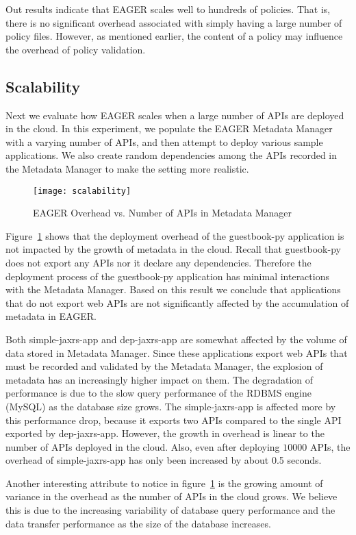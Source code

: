 Out results indicate that EAGER scales well to hundreds of policies. That is,
there is no significant overhead associated with simply having a large number
of policy files. However, as mentioned earlier, the content of a policy may
influence the overhead of policy validation.
 
\subsection{Scalability}
Next we evaluate how EAGER scales when a large number of APIs are deployed in the cloud. In this experiment, we populate the EAGER
Metadata Manager with a varying number of APIs, and then attempt to deploy various sample applications. We also create
random dependencies among the APIs recorded in the Metadata Manager to make the setting more realistic.

\begin{figure}
\centering
\texttt{[image: scalability]}
\caption{EAGER Overhead vs. Number of APIs in Metadata Manager}
\label{fig:scalability}
\end{figure}

Figure~\ref{fig:scalability} shows that the deployment overhead of the guestbook-py application is not impacted by the growth of metadata
in the cloud. Recall that guestbook-py does not export any APIs nor it declare any dependencies. Therefore the deployment process of
the guestbook-py application has minimal interactions with the Metadata Manager. Based on this result we conclude that applications that
do not export web APIs are not significantly affected by the accumulation of metadata in EAGER.

Both simple-jaxrs-app and dep-jaxrs-app are
somewhat affected by the volume of data stored in Metadata Manager. Since these applications export web APIs that must be 
recorded and validated by the Metadata Manager, the explosion of metadata has an increasingly higher impact on them. The degradation 
of performance is due to the slow query performance of the RDBMS engine (MySQL) as the database size grows. The simple-jaxrs-app
is affected more by this performance drop, because it exports two APIs compared to the single API exported 
by dep-jaxrs-app. However, the growth
in overhead is linear to the number of APIs deployed in the cloud. Also,
even after deploying $10000$ APIs, the overhead of simple-jaxrs-app has only been increased by about 0.5 seconds.

Another interesting attribute to notice in figure~\ref{fig:scalability} is the
growing amount of variance in the overhead as the number of APIs in the cloud
grows.  We believe this is due to the increasing variability of database query
performance and the data transfer performance as the size of the database
increases.

